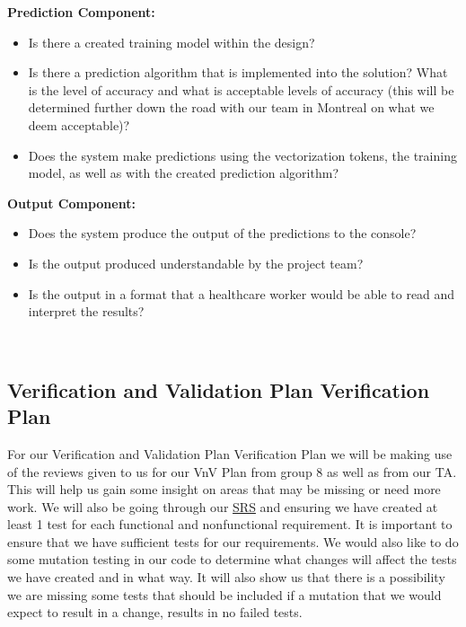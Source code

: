\documentclass[12pt, titlepage]{article}
\begin{document}
  \noindent \textbf{Prediction Component:}
  \begin{itemize}
  \item Is there a created training model within the design?
  \item Is there a prediction algorithm that is implemented into the solution? What is the level of accuracy and what is acceptable levels of accuracy (this will be determined further down the road with our team in Montreal on what we deem acceptable)?
  \item Does the system make predictions using the vectorization tokens, the training model, as well as with the created prediction algorithm?\\
  \end{itemize}
  
  
  \noindent \textbf{Output Component:}
  \begin{itemize}
  \item Does the system produce the output of the predictions to the console?
  \item Is the output produced understandable by the project team?
  \item Is the output in a format that a healthcare worker would be able to read and interpret the results?
  \end{itemize}
  \\
  
  
  \subsection{Verification and Validation Plan Verification Plan}
  
  For our Verification and Validation Plan Verification Plan we will be making use of the reviews given to us for our VnV Plan from group 8 as well as from our TA. This will help us gain some insight on areas that may be missing or need more work. We will also be going through our \href{https://github.com/MichaelBreau/nlp-mentalhealth/blob/main/docs/SRS/index.pdf}{SRS} and ensuring we have created at least 1 test for each functional and nonfunctional requirement. It is important to ensure that we have sufficient tests for our requirements. We would also like to do some mutation testing in our code to determine what changes will affect the tests we have created and in what way. It will also show us that there is a possibility we are missing some tests that should be included if a mutation that we would expect to result in a change, results in no failed tests.\\  
\end{document}
